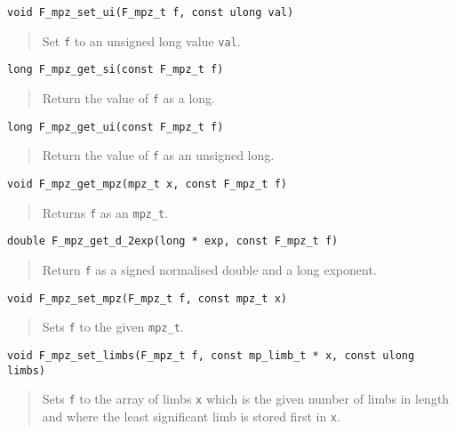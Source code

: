 \documentclass[a4paper,10pt]{article}
\newcommand{\code}{\lstinline}
\begin{document}
\begin{lstlisting}
void F_mpz_set_ui(F_mpz_t f, const ulong val)
\end{lstlisting}
\begin{quote}
Set \code{f} to an unsigned long value \code{val}.
\end{quote}

\begin{lstlisting}
long F_mpz_get_si(const F_mpz_t f)
\end{lstlisting}
\begin{quote}
Return the value of \code{f} as a long.
\end{quote}

\begin{lstlisting}
long F_mpz_get_ui(const F_mpz_t f)
\end{lstlisting}
\begin{quote}
Return the value of \code{f} as an unsigned long.
\end{quote}

\begin{lstlisting}
void F_mpz_get_mpz(mpz_t x, const F_mpz_t f)
\end{lstlisting}
\begin{quote}
Returns \code{f} as an \code{mpz_t}.
\end{quote}

\begin{lstlisting}
double F_mpz_get_d_2exp(long * exp, const F_mpz_t f)
\end{lstlisting}
\begin{quote}
Return \code{f} as a signed normalised double and a long exponent.
\end{quote}

\begin{lstlisting}
void F_mpz_set_mpz(F_mpz_t f, const mpz_t x)
\end{lstlisting}
\begin{quote}
Sets \code{f} to the given \code{mpz_t}.
\end{quote}

\begin{lstlisting}
void F_mpz_set_limbs(F_mpz_t f, const mp_limb_t * x, const ulong limbs)
\end{lstlisting}
\begin{quote}
Sets \code{f} to the array of limbs \code{x} which is the given number of limbs in length and where the least significant limb is stored first in \code{x}.
\end{quote}
\end{document}
